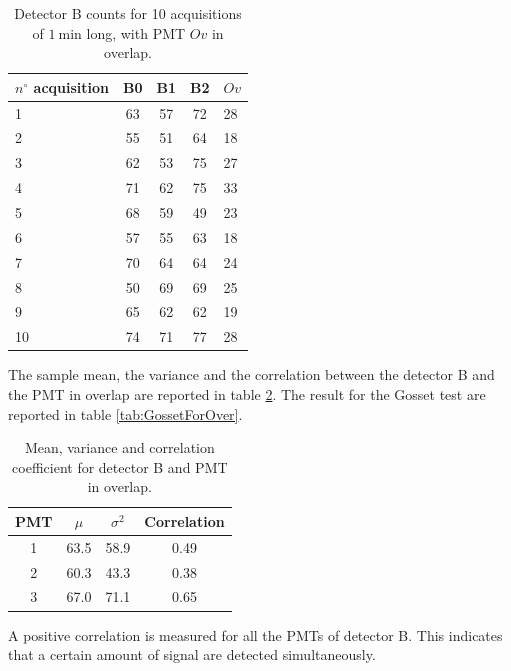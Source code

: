 \begin{table}[ht]
\centering
\begin{tabular}{lcccl}
\hline 
$n^{\circ}$ acquisition  & B0 & B1 & B2 & $Ov$ \\ 
\hline 
1 & 63 & 57 & 72 & 28 \\ 
 
2 & 55 & 51 & 64 & 18 \\ 
 
3 & 62 & 53 & 75 & 27 \\ 
 
4 & 71 & 62 & 75 & 33 \\ 
 
5 & 68 & 59 & 49 & 23 \\ 
 
6 & 57 & 55 & 63 & 18 \\ 
 
7 & 70 & 64 & 64 & 24 \\ 
 
8 & 50 & 69 & 69 & 25 \\ 
 
9 & 65 & 62 & 62 & 19 \\ 
 
10 & 74 & 71 & 77 & 28 \\ 
\hline
\end{tabular} 
\caption{Detector B counts for 10 acquisitions of $\SI{1}{\minute}$ long, with PMT $Ov$ in overlap.}
\label{tab:OverlapB}
\end{table} 

The sample mean, the variance and the correlation between the detector B and the PMT in overlap are reported in table \ref{tab:ResultBB}. The result for the Gosset test are reported in table \ref{tab:GossetForOver}.

\begin{table}[ht]
\centering
\begin{tabular}{c|c|c|c}
\hline 
PMT & $\mu$ & $\sigma^{2}$ & Correlation \\
\hline
1 	& 63.5	& 58.9	& 0.49 \\
2 	& 60.3	& 43.3	& 0.38 \\
3	& 67.0	& 71.1  & 0.65 \\
\hline
\end{tabular}
\caption{Mean, variance and correlation coefficient for detector B and PMT in overlap.}
\label{tab:ResultBB}
\end{table}

A positive correlation is measured for all the PMTs of detector B. This indicates that a certain amount of signal are detected simultaneously.

